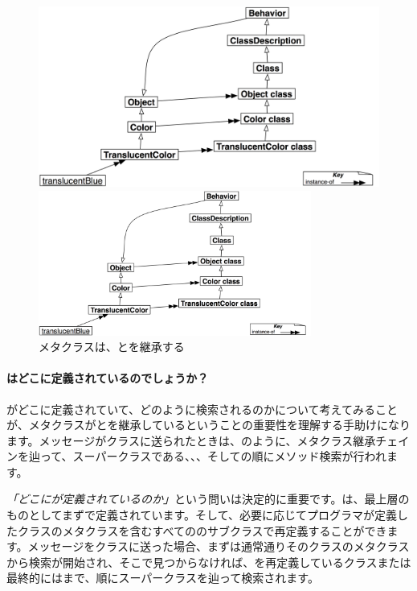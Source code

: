 \documentclass[a4paper,10pt,twoside]{book}
\begin{document}
\begin{center}
\begin{figure}
\ifluluelse
	{\centerline{\includegraphics[width=\textwidth]{TranslucentBehavior}}}
	{\centerline{\includegraphics[width=0.8\textwidth]{TranslucentBehavior}}}
\caption{メタクラスは、とを継承する}
\end{figure}
\end{center}

\paragraph{はどこに定義されているのでしょうか？}
がどこに定義されていて、どのように検索されるのかについて考えてみることが、メタクラスがとを継承しているということの重要性を理解する手助けになります。メッセージがクラスに送られたときは、のように、メタクラス継承チェインを辿って、スーパークラスである、、、そしての順にメソッド検索が行われます。

\emph{「どこにが定義されているのか」}という問いは決定的に重要です。は、最上層のものとしてまずで定義されています。そして、必要に応じてプログラマが定義したクラスのメタクラスを含むすべてののサブクラスで再定義することができます。メッセージをクラスに送った場合、まずは通常通りそのクラスのメタクラスから検索が開始され、そこで見つからなければ、を再定義しているクラスまたは最終的にはまで、順にスーパークラスを辿って検索されます。
\end{document}
